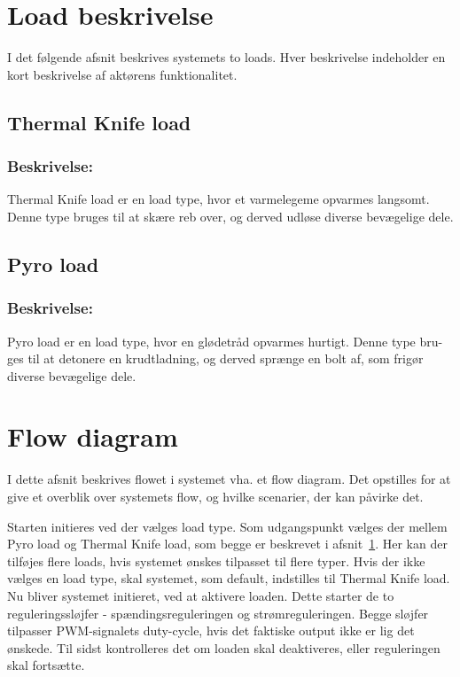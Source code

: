 \clearpage


\section{Load beskrivelse} \label{load_types}
I det følgende afsnit beskrives systemets to loads. Hver beskrivelse indeholder en kort beskrivelse af aktørens funktionalitet.


\begin{framed}
	\subsection{Thermal Knife load}

	\subsubsection*{Beskrivelse:}
	Thermal Knife load er en load type, hvor et varmelegeme opvarmes langsomt. \indent Denne type bruges til at skære reb over, og derved udløse diverse bevægelige \indent dele.
\end{framed}

\begin{framed}
	\subsection{Pyro load}
	
	\subsubsection*{Beskrivelse:}
	Pyro load er en load type, hvor en glødetråd opvarmes hurtigt. Denne type bru- \indent ges til at detonere en krudtladning, og derved sprænge en bolt af, som frigør \indent diverse bevægelige dele.
\end{framed}

\clearpage

\section{Flow diagram}
I dette afsnit beskrives flowet i systemet vha. et flow diagram. Det opstilles for at give et overblik over systemets flow, og hvilke scenarier, der kan påvirke det. 

Starten initieres ved der vælges load type. Som udgangspunkt vælges der mellem Pyro load og Thermal Knife load, som begge er beskrevet i afsnit~\ref{load_types}. Her kan der tilføjes flere loads, hvis systemet ønskes tilpasset til flere typer. Hvis der ikke vælges en load type, skal systemet, som default, indstilles til Thermal Knife load. Nu bliver systemet initieret, ved at aktivere loaden. Dette starter de to reguleringssløjfer - spændingsreguleringen og strømreguleringen. Begge sløjfer tilpasser PWM-signalets duty-cycle, hvis det faktiske output ikke er lig det ønskede. Til sidst kontrolleres det om loaden skal deaktiveres, eller reguleringen skal fortsætte.


